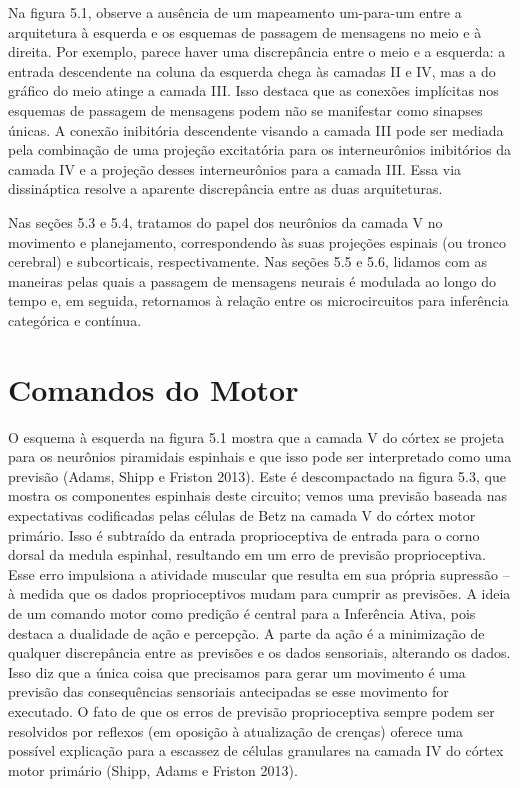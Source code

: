 \documentclass[
  12pt,
]{book}
\begin{document}
Na figura 5.1, observe a ausência de um mapeamento um-para-um entre a arquitetura à esquerda e os esquemas de passagem de mensagens no meio e à direita. Por exemplo, parece haver uma discrepância entre o meio e a esquerda: a entrada descendente na coluna da esquerda chega às camadas II e IV, mas a do gráfico do meio atinge a camada III. Isso destaca que as conexões implícitas nos esquemas de passagem de mensagens podem não se manifestar como sinapses únicas. A conexão inibitória descendente visando a camada III pode ser mediada pela combinação de uma projeção excitatória para os interneurônios inibitórios da camada IV e a projeção desses interneurônios para a camada III. Essa via dissináptica resolve a aparente discrepância entre as duas arquiteturas.

Nas seções 5.3 e 5.4, tratamos do papel dos neurônios da camada V no movimento e planejamento, correspondendo às suas projeções espinais (ou tronco cerebral) e subcorticais, respectivamente. Nas seções 5.5 e 5.6, lidamos com as maneiras pelas quais a passagem de mensagens neurais é modulada ao longo do tempo e, em seguida, retornamos à relação entre os microcircuitos para inferência categórica e contínua.

\hypertarget{comandos-do-motor}{%
\section{Comandos do Motor}\label{comandos-do-motor}}

O esquema à esquerda na figura 5.1 mostra que a camada V do córtex se projeta para os neurônios piramidais espinhais e que isso pode ser interpretado como uma previsão (Adams, Shipp e Friston 2013). Este é descompactado na figura 5.3, que mostra os componentes espinhais deste circuito; vemos uma previsão baseada nas expectativas codificadas pelas células de Betz na camada V do córtex motor primário. Isso é subtraído da entrada proprioceptiva de entrada para o corno dorsal da medula espinhal, resultando em um erro de previsão proprioceptiva. Esse erro impulsiona a atividade muscular que resulta em sua própria supressão -- à medida que os dados proprioceptivos mudam para cumprir as previsões. A ideia de um comando motor como predição é central para a Inferência Ativa, pois destaca a dualidade de ação e percepção. A parte da ação é a minimização de qualquer discrepância entre as previsões e os dados sensoriais, alterando os dados. Isso diz que a única coisa que precisamos para gerar um movimento é uma previsão das consequências sensoriais antecipadas se esse movimento for executado. O fato de que os erros de previsão proprioceptiva sempre podem ser resolvidos por reflexos (em oposição à atualização de crenças) oferece uma possível explicação para a escassez de células granulares na camada IV do córtex motor primário (Shipp, Adams e Friston 2013).
\end{document}
